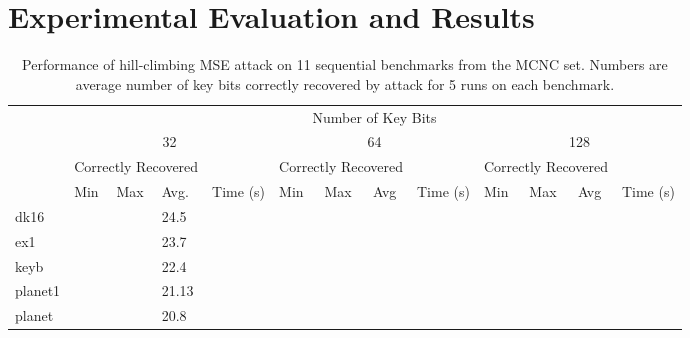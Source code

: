 \section{Experimental Evaluation and Results}



\begin{table*}[ht]
\centering
\caption{Performance of hill-climbing MSE attack on 11 sequential benchmarks from the MCNC set. Numbers are average number of key bits correctly recovered by attack for 5 runs on each benchmark.}
\label{my-label}
\begin{tabular}{|l|l|l|l|l|l|l|l|l|l|l|l|l|}
\hline
\multirow{4}{*}{} & \multicolumn{12}{c|}{Number of Key Bits}                                                                                                                        \\ \cline{2-13} 
                  & \multicolumn{4}{c|}{32}                             & \multicolumn{4}{c|}{64}                             & \multicolumn{4}{c|}{128}                            \\ \cline{2-13} 
                  & \multicolumn{3}{l|}{Correctly Recovered} &          & \multicolumn{3}{l|}{Correctly Recovered} &          & \multicolumn{3}{l|}{Correctly Recovered} &          \\ \cline{2-13} 
                  & Min         & Max         & Avg.         & Time (s) & Min         & Max         & Avg          & Time (s) & Min         & Max         & Avg          & Time (s) \\ \hline
dk16              &           &           & 24.5         &          &           &           &          &          &           &           &          &          \\ \hline
ex1              &           &           & 23.7         &          &           &           &            &          &           &           &          &          \\ \hline
keyb             &           &           & 22.4         &          &           &           &          &          & 
&           &          &          \\ \hline
planet1             &           &           & 21.13         &          &           &           &          &         &           &           &          &          \\ \hline
planet             &           &           & 20.8         &          &           &           &          &         &           &           &          &          \\ \hline

\end{tabular}
\end{table*}
